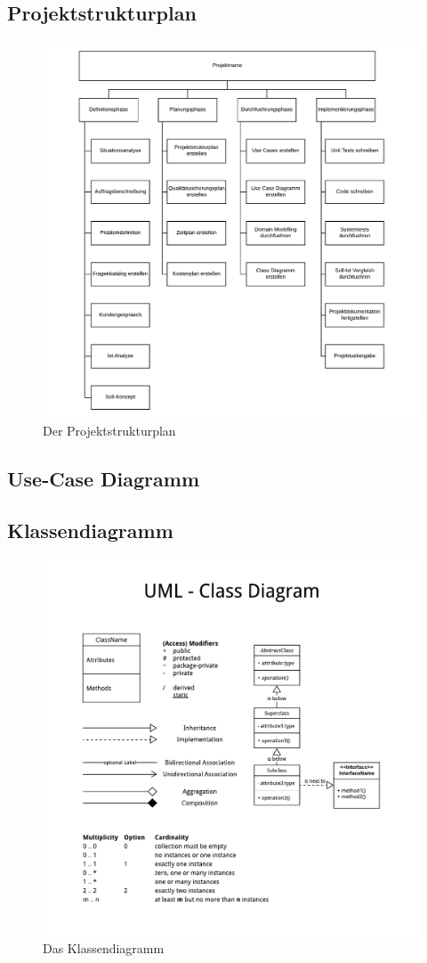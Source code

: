 \documentclass[11pt, a4paper]{article}
\begin{document}
    \subsection{Projektstrukturplan}
      \begin{figure}[h!]
        \includegraphics[width=\linewidth]{fig/Projektstrukturplan.pdf}
        \caption{Der Projektstrukturplan}
        \label{fig:psp}
      \end{figure}
      \newpage
    \subsection{Use-Case Diagramm}
      \newpage
    \subsection{Klassendiagramm}
      \begin{figure}[h!]
        \includegraphics[width=\linewidth]{fig/UML_Classdiagram.pdf}
        \caption{Das Klassendiagramm}
        \label{fig:classdiagram}
      \end{figure}
      \newpage
\end{document}
